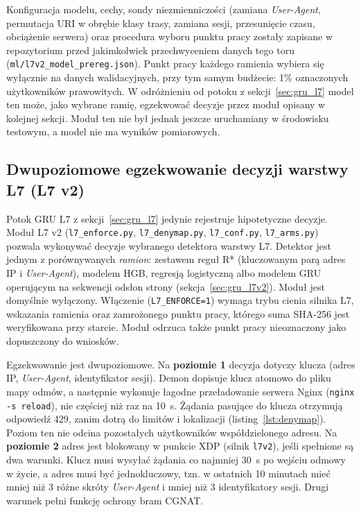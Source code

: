 \documentclass[a4paper,12pt]{article}
\begin{document}
Konfiguracja modelu, cechy, sondy niezmienniczości (zamiana \textit{User-Agent}, permutacja URI w obrębie klasy trasy, zamiana sesji, przesunięcie czasu, obciążenie serwera) oraz procedura wyboru punktu pracy zostały zapisane w repozytorium przed jakimkolwiek przechwyceniem danych tego toru (\texttt{ml/l7v2\_model\_prereg.json}). Punkt pracy każdego ramienia wybiera się wyłącznie na danych walidacyjnych, przy tym samym budżecie: 1\% oznaczonych użytkowników prawowitych. W odróżnieniu od potoku z sekcji~\ref{sec:gru_l7} model ten może, jako wybrane ramię, egzekwować decyzje przez moduł opisany w kolejnej sekcji. Moduł ten nie był jednak jeszcze uruchamiany w środowisku testowym, a model nie ma wyników pomiarowych.

\subsection{Dwupoziomowe egzekwowanie decyzji warstwy L7 (L7 v2)}\label{sec:impl_l7v2}
Potok GRU L7 z sekcji~\ref{sec:gru_l7} jedynie rejestruje hipotetyczne decyzje. Moduł L7 v2 (\texttt{l7\_enforce.py}, \texttt{l7\_denymap.py}, \texttt{l7\_conf.py}, \texttt{l7\_arms.py}) pozwala wykonywać decyzje wybranego detektora warstwy L7. Detektor jest jednym z porównywanych \emph{ramion}: zestawem reguł R* (kluczowanym parą adres IP i \textit{User-Agent}), modelem HGB, regresją logistyczną albo modelem GRU operującym na sekwencji odsłon strony (sekcja~\ref{sec:gru_l7v2}). Moduł jest domyślnie wyłączony. Włączenie (\texttt{L7\_ENFORCE=1}) wymaga trybu cienia silnika L7, wskazania ramienia oraz zamrożonego punktu pracy, którego suma SHA-256 jest weryfikowana przy starcie. Moduł odrzuca także punkt pracy nieoznaczony jako dopuszczony do wniosków.

Egzekwowanie jest dwupoziomowe. Na \textbf{poziomie 1} decyzja dotyczy klucza (adres IP, \textit{User-Agent}, identyfikator sesji). Demon dopisuje klucz atomowo do pliku mapy odmów, a następnie wykonuje łagodne przeładowanie serwera Nginx (\texttt{nginx -s reload}), nie częściej niż raz na 10~s. Żądania pasujące do klucza otrzymują odpowiedź 429, zanim dotrą do limitów i lokalizacji (listing~\ref{lst:denymap}). Poziom ten nie odcina pozostałych użytkowników współdzielonego adresu. Na \textbf{poziomie 2} adres jest blokowany w punkcie XDP (silnik \texttt{l7v2}), jeśli spełnione są dwa warunki. Klucz musi wysyłać żądania co najmniej 30~s po wejściu odmowy w życie, a adres musi być jednokluczowy, tzn. w ostatnich 10 minutach mieć mniej niż 3 różne skróty \textit{User-Agent} i mniej niż 3 identyfikatory sesji. Drugi warunek pełni funkcję ochrony bram CGNAT.
\end{document}
